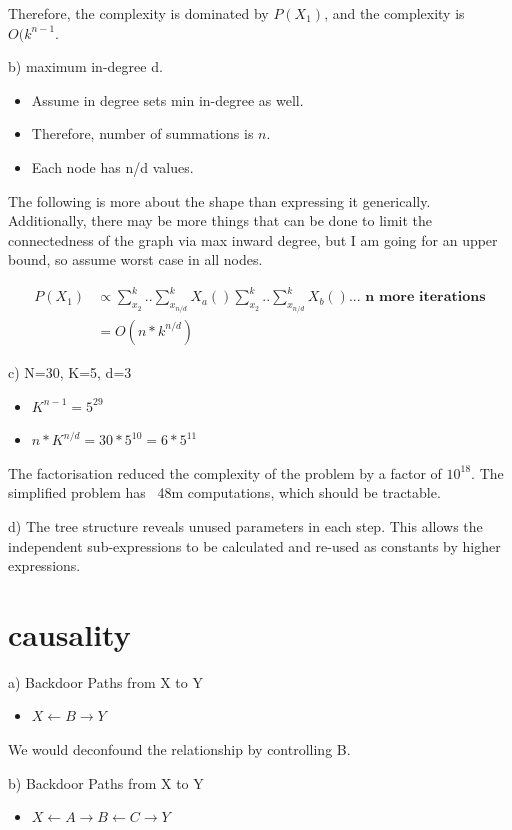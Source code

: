 \documentclass[11pt]{article}
\begin{document}
Therefore, the complexity is dominated by ${P(X_1)}$, and the complexity is ${ O(k^{n-1}}$.

b) maximum in-degree d.

\begin{itemize}
	\item Assume in degree sets min in-degree as well.
	\item Therefore, number of summations is ${n}$.
	\item Each node has n/d values.
\end{itemize}

The following is more about the shape than expressing it generically. Additionally, there may be more things that can be done to limit the connectedness of the graph via max inward degree, but I am going for an upper bound, so assume worst case in all nodes.

\begin{align*}
	P(X_1) &\propto \sum_{x_2}^{k}..\sum_{x_{n/d}}^{k}X_a()\sum_{x_2}^{k}..\sum_{x_{n/d}}^{k}X_b()  ... \textbf{ n more iterations} \\
	&= O(n * k^{n/d})
\end{align*}

c) N=30, K=5, d=3

\begin{itemize}
	\item ${K^{n-1} = 5^{29}}$
	\item ${n*K^{n/d} = 30 * 5^{10} = 6 * 5^{11}}$
\end{itemize}

The factorisation reduced the complexity of the problem by a factor of ${10^18}$. The simplified problem has ~48m computations, which should be tractable.

d) The tree structure reveals unused parameters in each step. This allows the independent sub-expressions to be calculated and re-used as constants by higher expressions.

\section{causality}

a) Backdoor Paths from X to Y
\begin{itemize}
	\item ${X \leftarrow B \rightarrow Y}$
\end{itemize}

We would deconfound the relationship by controlling B.

b) Backdoor Paths from X to Y
\begin{itemize}
	\item ${X \leftarrow A \rightarrow B \leftarrow C \rightarrow Y}$
\end{itemize}
\end{document}
